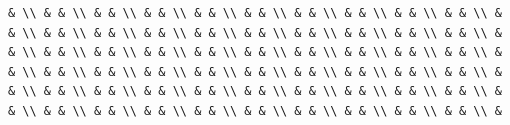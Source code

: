 \documentclass[
  ukrainian,
]{article}
\begin{document}
\begin{verbatim}
& \\ & & \\ & & \\ & & \\ & & \\ & & \\ & & \\ & & \\ & & \\ & & \\ & & \\ & & \\ & & \\ & & \\ & & \\ & & \\ & & \\ & & \\ & & \\ & & \\ & & \\ & & \\ & & \\ & & \\ & & \\ & & \\ & & \\ & & \\ & & \\ & & \\ & & \\ & & \\ & & \\ & & \\ & & \\ & & \\ & & \\ & & \\ & & \\ & & \\ & & \\ & & \\ & & \\ & & \\ & & \\ & & \\ & & \\ & & \\ & & \\ & & \\ & & \\ & & \\ & & \\ & & \\ & & \\ & & \\ & & \\ & & \\ & & \\ & & \\ &
\end{verbatim}
\end{document}
